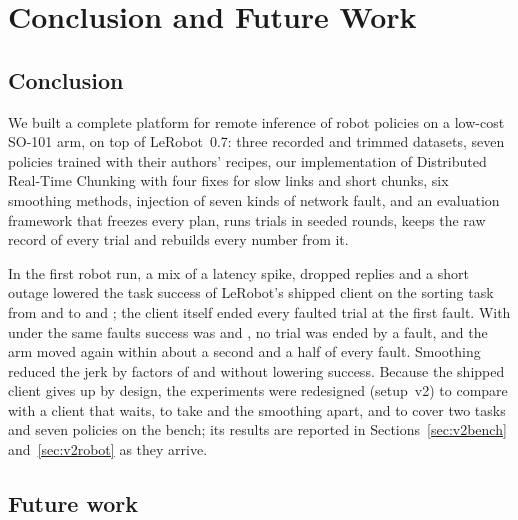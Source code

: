 
\chapter{Conclusion and Future Work}\label{ch:conclusion}

\section{Conclusion}

We built a complete platform for remote inference of robot policies on a low-cost SO-101 arm, on top of LeRobot~0.7:
three recorded and trimmed datasets, seven policies trained with their authors' recipes, our implementation of
Distributed Real-Time Chunking with four fixes for slow links and short chunks, six smoothing methods, injection of
seven kinds of network fault, and an evaluation framework that freezes every plan, runs trials in seeded rounds, keeps
the raw record of every trial and rebuilds every number from it.

In the first robot run, a mix of a latency spike, dropped replies and a short outage lowered the task success of
LeRobot's shipped client on the sorting task from  and  to
 and ; the client itself ended every faulted trial at the first fault.
With \drtc{} under the same faults success was  and , no trial was ended by
a fault, and the arm moved again within about a second and a half of every fault. Smoothing reduced the jerk by factors
of  and  without lowering success. Because the shipped client gives up
by design, the experiments were redesigned (setup~v2) to compare \drtc{} with a client that waits, to take \drtc{} and
the smoothing apart, and to cover two tasks and seven policies on the bench; its results are reported in
Sections~\ref{sec:v2bench} and~\ref{sec:v2robot} as they arrive.

\section{Future work}

